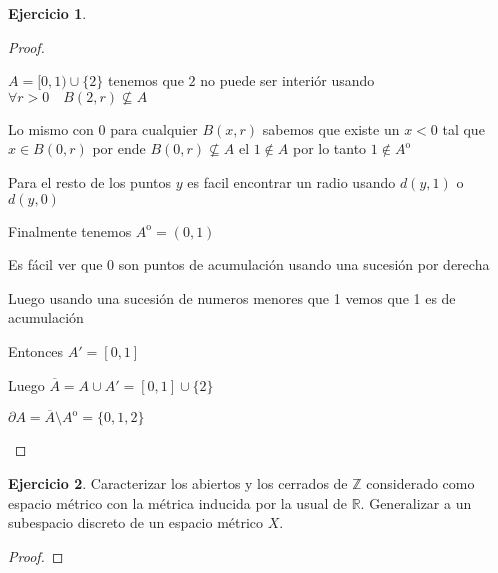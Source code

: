 \documentclass[12pt]{article}
\newcommand{\R}{\mathbb{R}}
\newcommand{\Z}{\mathbb{Z}}
\newcommand{\ol}{\overline}
\newcommand{\open}{\mathrm{o}}
\theoremstyle{definition}
\newtheorem{ej}{Ejercicio}
\begin{document}
\begin{ej}
\begin{proof}
\begin{enumerate}
$A = [0,1) \cup \{2\}$ tenemos que $2$ no puede ser interiór usando $\forall r > 0 \quad B(2,r) \not\subseteq A$

Lo mismo con $0$ para cualquier $B(x,r)$ sabemos que existe un $x < 0$ tal que $x \in B(0,r)$ por ende $B(0,r) \not\subseteq A$ el $1 \notin A$ por lo tanto $1 \notin A^{\open}$

Para el resto de los puntos $y$ es facil encontrar un radio usando $d(y,1)$ o $d(y,0)$  

Finalmente tenemos $A^{\open} = (0,1)$

Es fácil ver que $0$ son puntos de acumulación usando una sucesión por derecha

Luego usando una sucesión de numeros menores que 1 vemos que 1 es de acumulación 

Entonces $A' = [0,1] $

Luego $\ol A = A \cup A' = [0,1] \cup \{2\}$

$ \partial A = \ol{A} \setminus A^{\open} = \{0,1,2\} $
    \end{enumerate} 
  \end{proof}
\end{ej}

\begin{ej}
  Caracterizar los abiertos y los cerrados de $\Z$ considerado como espacio métrico con la métrica inducida por la usual de $\R$. Generalizar a un subespacio discreto de un espacio métrico $X$.
  \begin{proof}
      
  \end{proof}
\end{ej}
\end{document}
